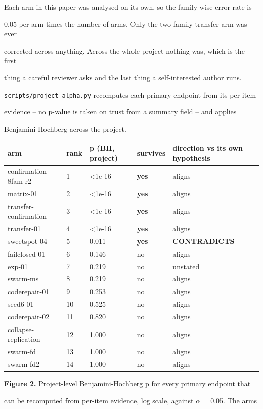 \documentclass[11pt]{article}
\begin{document}
Each arm in this paper was analysed on its own, so the family-wise error rate is

0.05 per arm times the number of arms. Only the two-family transfer arm was ever

corrected across anything. Across the whole project nothing was, which is the first

thing a careful reviewer asks and the last thing a self-interested author runs.

\texttt{scripts/project\_alpha.py} recomputes each primary endpoint from its per-item

evidence -- no p-value is taken on trust from a summary field -- and applies

Benjamini-Hochberg across the project.


\begin{center}\small\begin{tabular}{lllll}\hline
arm & rank & p (BH, project) & survives & direction vs its own hypothesis \\
\hline
confirmation-8fam-r2 & 1 & <1e-16 & {\bf yes} & aligns \\
matrix-01 & 2 & <1e-16 & {\bf yes} & aligns \\
transfer-confirmation & 3 & <1e-16 & {\bf yes} & aligns \\
transfer-01 & 4 & <1e-16 & {\bf yes} & aligns \\
sweetspot-04 & 5 & 0.011 & {\bf yes} & {\bf CONTRADICTS} \\
failclosed-01 & 6 & 0.146 & no & aligns \\
exp-01 & 7 & 0.219 & no & unstated \\
swarm-ms & 8 & 0.219 & no & aligns \\
coderepair-01 & 9 & 0.253 & no & aligns \\
seed6-01 & 10 & 0.525 & no & aligns \\
coderepair-02 & 11 & 0.820 & no & aligns \\
collapse-replication & 12 & 1.000 & no & aligns \\
swarm-fd & 13 & 1.000 & no & aligns \\
swarm-fd2 & 14 & 1.000 & no & aligns \\
\end{tabular}\end{center}

{\bf Figure 2.} Project-level Benjamini-Hochberg p for every primary endpoint that

can be recomputed from per-item evidence, log scale, against $\alpha$ = 0.05. The arms
\end{document}
